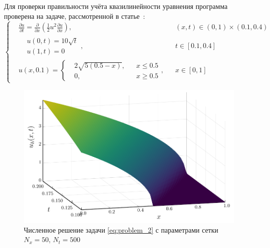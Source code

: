 Для проверки правильности учёта квазилинейности уравнения программа проверена на задаче, рассмотренной в статье~\cite{самарский1963примеры}:
\begin{equation*}
    \left\{
        \begin{aligned}
            &\frac{\partial u}{\partial t} = \frac{\partial }{\partial x}\left( \frac{1}{2}u^2 \frac{\partial u}{\partial x} \right), && (x, t) \in (0, 1)\times(0.1, 0.4)\\
            &\begin{aligned}
            &u(0, t) = 10\sqrt{t}\\
            &u(1, t) = 0
            \end{aligned}, && t\in [0.1, 0.4]\\
            &u(x, 0.1) = \left\{ \begin{aligned}
                &2\sqrt{5(0.5 - x)}, && x \le 0.5\\
                & 0, && x\ge 0.5
            \end{aligned}\right. , && x \in [0, 1]
        \end{aligned}
    \right.
\end{equation*}
\begin{figure}
    \centering
    \includegraphics{Разностные_схемы_на_статических_сетках/Программный_код_примеры_расчётов/explicit_scheme/problem_2_implicit_surface.pdf}
    \caption{Численное решение задачи \eqref{eq:problem_2} с параметрами сетки $N_x = 50$, $N_t = 500$}
    \label{fig:problem_2_implicit_surface}
\end{figure}
